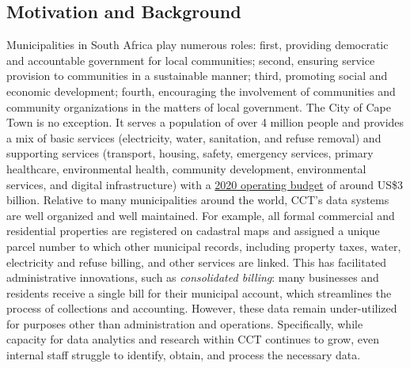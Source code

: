 \hypertarget{motivation-and-background-5}{%
\subsection{Motivation and Background}\label{motivation-and-background-5}}

Municipalities in South Africa play numerous roles: first, providing democratic and accountable government for local communities; second, ensuring service provision to communities in a sustainable manner; third, promoting social and economic development; fourth, encouraging the involvement of communities and community organizations in the matters of local government. The City of Cape Town is no exception. It serves a population of over 4 million people and provides a mix of basic services (electricity, water, sanitation, and refuse removal) and supporting services (transport, housing, safety, emergency services, primary healthcare, environmental health, community development, environmental services, and digital infrastructure) with a \href{http://resource.capetown.gov.za/documentcentre/Documents/Financial\%20documents/1920AdjBudget_Ann1_1_OpexAdjSummary_May2020.pdf}{2020 operating budget} of around US\$3 billion. Relative to many municipalities around the world, CCT's data systems are well organized and well maintained. For example, all formal commercial and residential properties are registered on cadastral maps and assigned a unique parcel number to which other municipal records, including property taxes, water, electricity and refuse billing, and other services are linked. This has facilitated administrative innovations, such as \emph{consolidated billing}: many businesses and residents receive a single bill for their municipal account, which streamlines the process of collections and accounting. However, these data remain under-utilized for purposes other than administration and operations. Specifically, while capacity for data analytics and research within CCT continues to grow, even internal staff struggle to identify, obtain, and process the necessary data.

